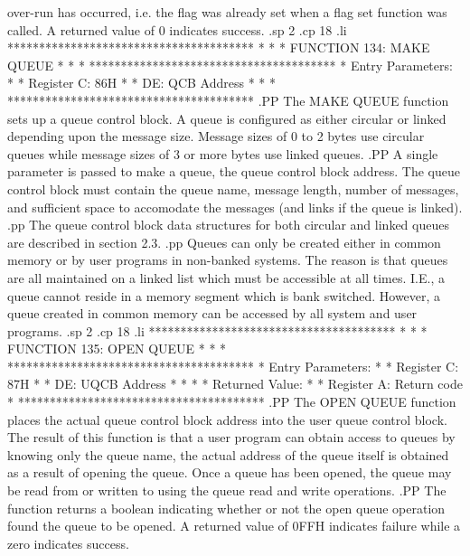 over-run has occurred, i.e. the flag was already set when a flag set
function was called.  A returned value of 0 indicates success.
.sp 2
.cp 18
.li
***************************************
*                                     *
*  FUNCTION 134:  MAKE QUEUE          *
*                                     *
***************************************
*  Entry Parameters:                  *
*      Register   C:  86H             *
*                DE:  QCB Address     *
*                                     *
***************************************
.PP
The MAKE QUEUE function sets up a queue control
block.  A queue is configured as either circular or linked depending
upon the message size.  Message sizes of 0 to 2 bytes use circular
queues while message sizes of 3 or more bytes use linked queues.
.PP
A single parameter is passed to make a queue, the queue control block
address.  The queue control block must contain the queue name, message
length, number of messages, and sufficient space to accomodate the
messages (and links if the queue is linked).
.pp
The queue control block data structures for both circular and linked
queues are described in section 2.3.
.pp
Queues can only be created either in common memory or by
user programs in non-banked systems.  The reason is that
queues are all maintained on a linked list which must be
accessible at all times.  I.E., a queue cannot reside in a
memory segment which is bank switched.  However, a queue
created in common memory can be accessed by all system and
user programs.
.sp 2
.cp 18
.li
***************************************
*                                     *
*  FUNCTION 135:  OPEN QUEUE          *
*                                     *
***************************************
*  Entry Parameters:                  *
*      Register   C:  87H             *
*                DE:  UQCB Address    *
*                                     *
*  Returned   Value:                  *
*      Register   A:  Return code     *
***************************************
.PP
The OPEN QUEUE function places the actual queue
control block address into the user queue control block.
The result of this function is that a user program can obtain access
to queues by knowing only the queue name, the actual address
of the queue itself is obtained as a result of opening the queue.
Once a queue has been opened, the queue may be read from or written to
using the queue read and write operations.
.PP
The function returns a boolean indicating whether or not the open
queue operation found the queue to be opened.  A returned value of
0FFH indicates failure while a zero indicates success.
